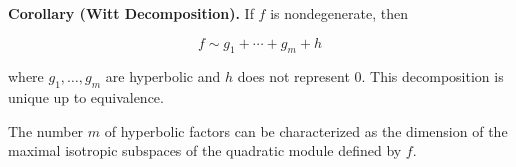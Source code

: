 \textbf{Corollary (Witt Decomposition).} If $f$ is nondegenerate, then

$$f \sim g_1 + \cdots + g_m + h$$

where $g_1, \ldots, g_m$ are hyperbolic and $h$ does not represent $0$. This decomposition is unique up to equivalence.

The number $m$ of hyperbolic factors can be characterized as the dimension of the maximal isotropic subspaces of the quadratic module defined by $f$.
